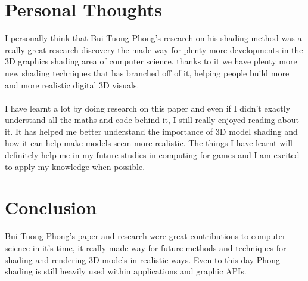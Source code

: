 \documentclass{scrartcl}
\begin{document}
\section{Personal Thoughts}
I personally think that Bui Tuong Phong's research on his shading method was a really great research discovery the made way for plenty more developments in the 3D graphics shading area of computer science. thanks to it we have plenty more new shading techniques that has branched off of it, helping people build more and more realistic digital 3D visuals.
\\~\\
I have learnt a lot by doing research on this paper and even if I didn't exactly understand all the maths and code behind it, I still really enjoyed reading about it. It has helped me better understand the importance of 3D model shading and how it can help make models seem more realistic. The things I have learnt will definitely help me in my future studies in computing for games and I am excited to apply my knowledge when possible.

\section{Conclusion}
Bui Tuong Phong's paper and research were great contributions to computer science in it's time, it really made way for future methods and techniques for shading and rendering 3D models in realistic ways. Even to this day Phong shading is still heavily used within applications and graphic APIs.



\end{document}
